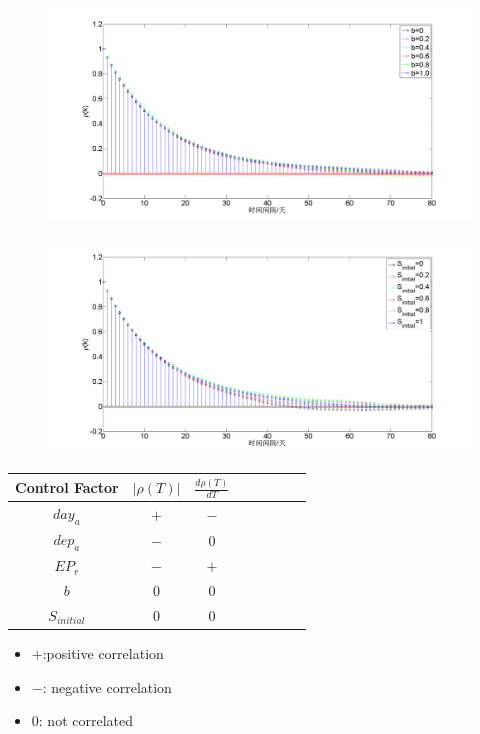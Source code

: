 \documentclass[10pt]{beamer}
\begin{document}
{{\begin{figure}
\end{figure}
}
{
\begin{figure}
\centering
\includegraphics[width=\textwidth]{b_corr.png} 
 
\end{figure}
}
{
\begin{figure}
\centering
\includegraphics[width=\textwidth]{initial_s_corr.png} 
\end{figure}
}
{
\begin{table}[H] 
\centering
\begin{tabular}{cccccccc}
\hline 
Control Factor&$|\rho (T)|$& $\frac{d\rho (T)}{dT}$\\
\hline 
$day_a$&$+$&$-$ \\ 
$dep_a$&$-$ &$0$\\ 
$EP_r$&$-$ &$+$ \\ 
$b$&$0$ &$0$ \\ 
$S_{initial}$&$0$ &$0$ \\ 
\hline 
\end{tabular}
\end{table}

\begin{itemize}
\item $+$:positive correlation
\item $-$: negative correlation
\item $0$: not correlated
\end{itemize}
}
}
\end{document}
